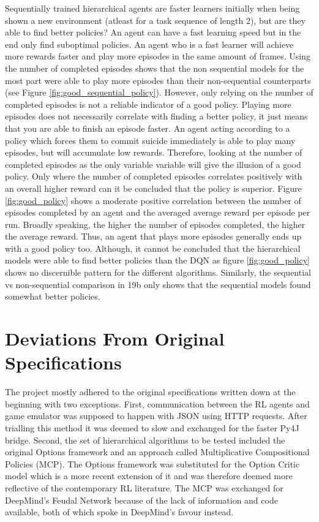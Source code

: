 \documentclass[notitlepage,a4paper,11pt]{article}
\begin{document}
Sequentially trained hierarchical agents are faster learners initially when being shown a new environment (atleast for a task sequence of length 2), but are they able to find better policies? An agent can have a fast learning speed but in the end only find suboptimal policies. An agent who is a fast learner will achieve more rewards faster and play more episodes in the same amount of frames. Using the number of completed episodes shows that the non sequential models for the most part were able to play more episodes than their non-sequential counterparts (see Figure \ref{fig:good_sequential_policy}). However, only relying on the number of completed episodes is not a reliable indicator of a good policy. Playing more episodes does not necessarily correlate with finding a better policy, it just means that you are able to finish an episode faster. An agent acting according to a policy which forces them to commit suicide immediately is able to play many episodes, but will accumulate low rewards. Therefore, looking at the number of completed episodes as the only variable variable will give the illusion of a good policy. Only where the number of completed episodes correlates positively with an overall higher reward can it be concluded that the policy is superior. Figure \ref{fig:good_policy} shows a moderate positive correlation between the number of episodes completed by an agent and the averaged average reward per episode per run. Broadly speaking, the higher the number of episodes completed, the higher the average reward. Thus, an agent that plays more episodes generally ends up with a good policy too. Although, it cannot be concluded that the hierarchical models were able to find better policies than the DQN as figure \ref{fig:good_policy} shows no discernible pattern for the different algorithms. Similarly, the sequential vs non-sequential comparison in 19b only shows that the sequential models found somewhat better policies.

\section{Deviations From Original Specifications}
The project mostly adhered to the original specifications written down at the beginning with two exceptions. First, communication between the RL agents and game emulator was supposed to happen with JSON using HTTP requests. After trialling this method it was deemed to slow and exchanged for the faster Py4J bridge. Second, the set of hierarchical algorithms to be tested included the original Options framework and an approach called Multiplicative Compositional Policies (MCP). The Options framework was substituted for the Option Critic model which is a more recent extension of it and was therefore deemed more reflective of the contemporary RL literature. The MCP was exchanged for DeepMind's Feudal Network because of the lack of information and code available, both of which spoke in DeepMind's favour instead.
\end{document}
